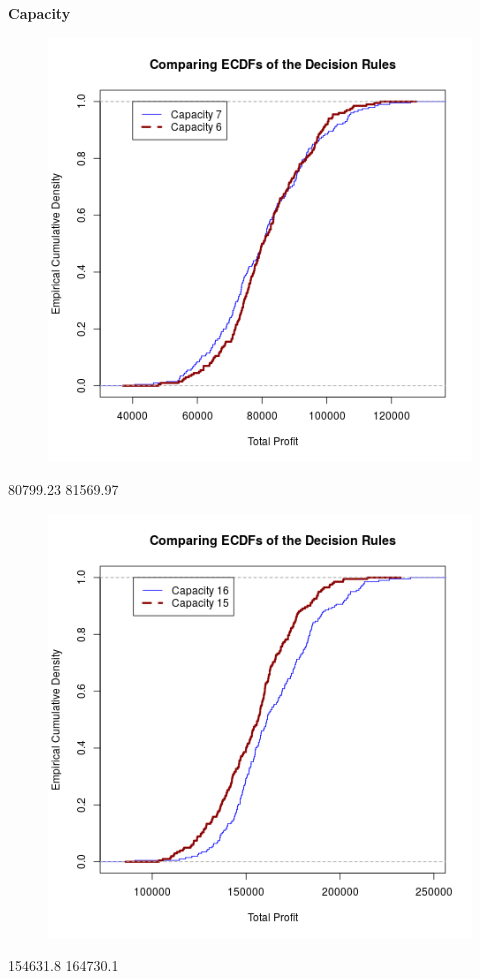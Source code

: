\documentclass[grey,handout]{beamer}
\renewcommand{\frametitle}[1]{\begin{center}\textbf{#1}\end{center}}
\begin{document}
\begin{frame}
  \frametitle{Capacity}
  \begin{multicols}{2}
  \begin{figure}[H]
  \centering
  \includegraphics[width=.5\textwidth]{capECDF.png}
  \end{figure}
  80799.23 81569.97
  \begin{figure}[H]
  \centering
  \includegraphics[width=.5\textwidth]{othcapECDF.png}
  \end{figure}
  154631.8 164730.1
  
  \end{multicols}
  
  
  \end{frame}
\end{document}
